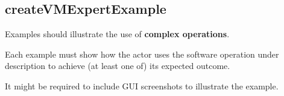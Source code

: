  
\subsection{createVMExpertExample}
Examples should illustrate the use of \textbf{complex operations}.

Each example must show how the actor uses the software operation under
description to achieve (at least one of) its expected outcome.

It might be required to include GUI screenshots to illustrate the example.



